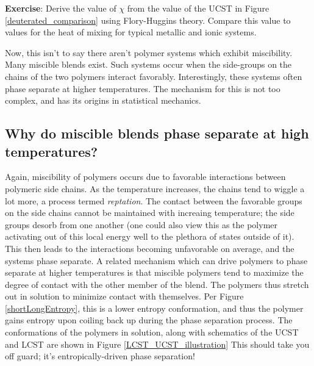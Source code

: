 \documentclass[12pt]{article}
\begin{document}
\textbf{Exercise}: Derive the value of $\chi$ from the value of the UCST in Figure \ref{deuterated_comparison} using Flory-Huggins theory. Compare this value to values for the heat of mixing for typical metallic and ionic systems. 

Now, this isn't to say there aren't polymer systems which exhibit miscibility. Many miscible blends exist. Such systems occur when the side-groups on the chains of the two polymers interact favorably. Interestingly, these systems often phase separate at higher temperatures. The mechanism for this is not too complex, and has its origins in statistical mechanics.

\subsection{Why do miscible blends phase separate at high temperatures?}

Again, miscibility of polymers occurs due to favorable interactions between polymeric side chains. As the temperature increases, the chains tend to wiggle a lot more, a process termed \emph{reptation}. The contact between the favorable groups on the side chains cannot be maintained with increaing temperature; the side groups desorb from one another (one could also view this as the polymer activating out of this local energy well to the plethora of states outside of it). This then leads to the interactions becoming unfavorable on average, and the systems phase separate. A related mechanism which can drive polymers to phase separate at higher temperatures is that miscible polymers tend to maximize the degree of contact with the other member of the blend. The polymers thus  stretch out in solution to minimize contact with themselves. Per Figure \ref{shortLongEntropy}, this is a lower entropy conformation, and thus the polymer gains entropy upon coiling back up during the phase separation process. The conformations of the polymers in solution, along with schematics of the UCST and LCST are shown in Figure \ref{LCST_UCST_illustration} This should take you off guard; it's entropically-driven phase separation! 
\end{document}
